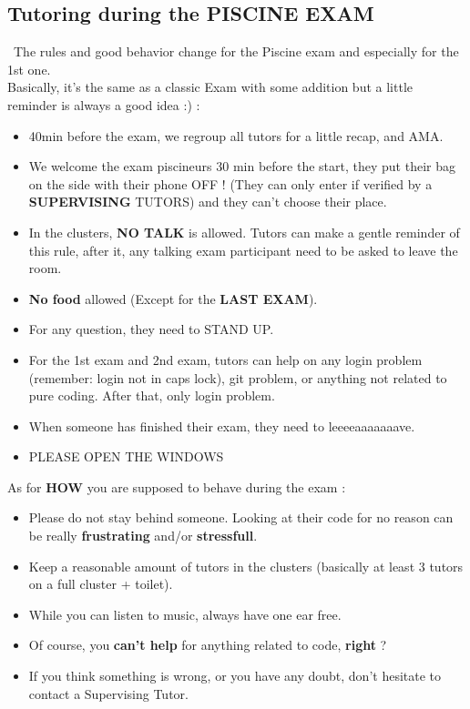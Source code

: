\documentclass{article}
\begin{document}
\clearpage
\subsection{Tutoring during the PISCINE EXAM}\
The rules and good behavior change for the Piscine exam and especially for the 1st one.\\
Basically, it's the same as a classic Exam with some addition but a little reminder is always a good idea :) : 
\begin{itemize}
    \item 40min before the exam, we regroup all tutors for a little recap, and AMA.
    \item We welcome the exam piscineurs 30 min before the start, they put their bag on the side with their phone OFF ! (They can only enter if verified by a \textbf{SUPERVISING} TUTORS) and they can't choose their place.
    \item In the clusters, \textbf{NO TALK} is allowed. Tutors can make a gentle reminder of this rule, after it, any talking exam participant need to be asked to leave the room.
    \item \textbf{No food} allowed (Except for the \textbf{LAST EXAM}).
    \item For any question, they need to STAND UP.
    \item For the 1st exam and 2nd exam, tutors can help on any login problem (remember: login not in caps lock), git problem, or anything not related to pure coding. After that, only login problem.
    \item When someone has finished their exam, they need to leeeeaaaaaaave.
    \item PLEASE OPEN THE WINDOWS
\end{itemize}
As for \textbf{HOW} you are supposed to behave during the exam :
\begin{itemize}
    \item Please do not stay behind someone. Looking at their code for no reason can be really \textbf{frustrating} and/or \textbf{stressfull}.
    \item Keep a reasonable amount of tutors in the clusters (basically at least 3 tutors on a full cluster + toilet).
    \item While you can listen to music, always have one ear free.
    \item Of course, you \textbf{can't help} for anything related to code, \textbf{right} ? 
    \item If you think something is wrong, or you have any doubt, don't hesitate to contact a Supervising Tutor.
    
    
\end{itemize}
\clearpage
\end{document}
